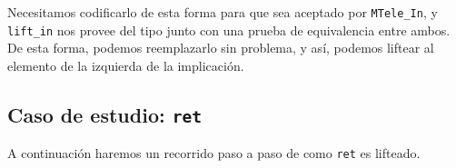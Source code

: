 Necesitamos codificarlo de esta forma para que sea aceptado por \lstinline{MTele_In}, y \lstinline{lift_in} nos provee del tipo junto con una prueba de equivalencia entre ambos. De esta forma, podemos reemplazarlo sin problema, y así, podemos liftear al elemento de la izquierda de la implicación.


\subsection{Caso de estudio: \texttt{ret}}

A continuación haremos un recorrido paso a paso de como \lstinline{ret} es lifteado.

